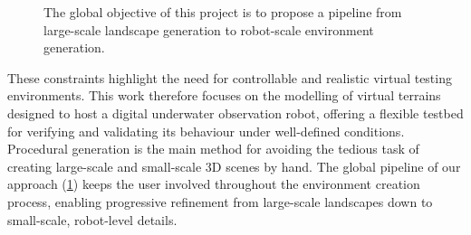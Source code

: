 \begin{figure}
    \caption[Global pipeline of the thesis]{The global objective of this project is to propose a pipeline from large-scale landscape generation to robot-scale environment generation. }
    \label{fig:intro-user-to-simu-pipeline}
\end{figure}


These constraints highlight the need for controllable and realistic virtual testing environments. This work therefore focuses on the modelling of virtual terrains designed to host a digital underwater observation robot, offering a flexible testbed for verifying and validating its behaviour under well-defined conditions. Procedural generation is the main method for avoiding the tedious task of creating large-scale and small-scale 3D scenes by hand. The global pipeline of our approach (\cref{fig:intro-user-to-simu-pipeline}) keeps the user involved throughout the environment creation process, enabling progressive refinement from large-scale landscapes down to small-scale, robot-level details.



